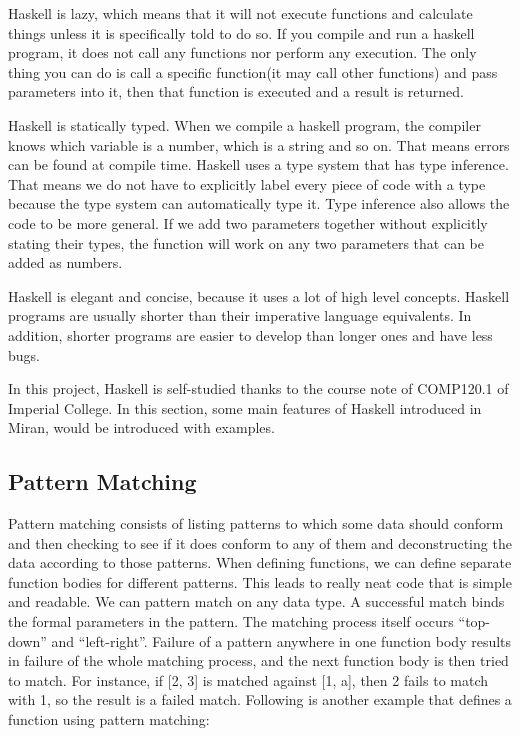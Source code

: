 Haskell is lazy, which means that it will not execute functions and calculate things unless it is specifically told to do so. If you compile and run a haskell program, it does not call any functions nor perform any execution. The only thing you can do is call a specific function(it may call other functions) and pass parameters into it, then that function is executed and a result is returned.   

Haskell is statically typed. When we compile a haskell program, the compiler knows which variable is a number, which is a string and so on. That means errors can be found at compile time. Haskell uses a type system that has type inference. That means we do not have to explicitly label every piece of code with a type because the type system can automatically type it. Type inference also allows the code to be more general. If we add two parameters together without explicitly stating their types, the function will work on any two parameters that can be added as numbers. 

Haskell is elegant and concise, because it uses a lot of high level concepts. Haskell programs are usually shorter than their imperative language equivalents. In addition, shorter programs are easier to develop than longer ones and have less bugs. 

In this project, Haskell is self-studied thanks to the course note of COMP120.1 of Imperial College. In this section, some main features of Haskell introduced in Miran\cite{miran2011}, would be introduced with examples.

\subsection{Pattern Matching}
Pattern matching consists of listing patterns to which some data should conform and then checking to see if it does conform to any of them and deconstructing the data according to those patterns. When defining functions, we can define separate function bodies for different patterns. This leads to really neat code that is simple and readable. We can pattern match on any data type. A successful match binds the formal parameters in the pattern. The matching process itself occurs ``top-down'' and ``left-right''. Failure of a pattern anywhere in one function body results in failure of the whole matching process, and the next function body is then tried to match. For instance, if [2, 3] is matched against [1, a], then 2 fails to match with 1, so the result is a failed match. Following is another example that defines a function using pattern matching:


